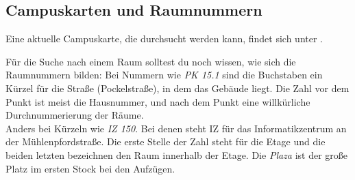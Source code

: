 
\subsection{Campuskarten und Raumnummern}
\label{campuskarte}
Eine aktuelle Campuskarte, die durchsucht werden kann, findet sich unter .



Für die Suche nach einem Raum solltest du noch wissen, wie sich die Raumnummern bilden: Bei Nummern wie \textit{PK 15.1} sind die Buchstaben ein Kürzel für die Straße (Pockelstraße), in dem das Gebäude liegt. Die Zahl vor dem Punkt ist meist die Hausnummer, und nach dem Punkt eine willkürliche Durchnummerierung der Räume.\\ Anders bei Kürzeln wie \textit{IZ 150}. Bei denen steht IZ für das Informatikzentrum an der Mühlenpfordstraße. Die erste Stelle der Zahl steht für die Etage und die beiden letzten bezeichnen den Raum innerhalb der Etage. Die \textit{Plaza} ist der große Platz im ersten Stock bei den Aufzügen.
